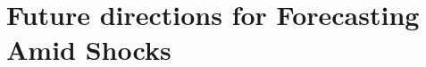 \documentclass[9pt]{beamer}
\theoremstyle{definition}
\begin{document}

          


\section{Future directions for Forecasting Amid Shocks}
\end{document}
